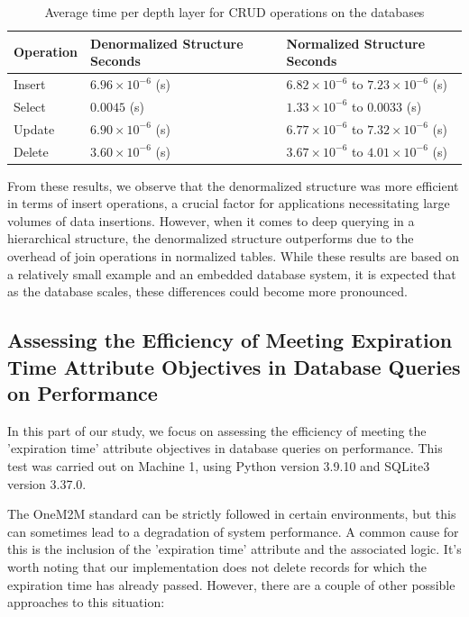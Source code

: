 \documentclass[a4paper,fleqn]{cas-dc}
\begin{document}
\begin{table}[h]
\scriptsize
\centering
\caption{Average time per depth layer for CRUD operations on the databases}
\label{tab:DBComparisonResults}
\begin{tabular}{ p{1cm} p{3cm} p{3cm} }
\hline
\textbf{Operation} & \textbf{Denormalized Structure Seconds} & \textbf{Normalized Structure Seconds} \\
\hline \hline
Insert & $6.96 \times 10^{-6}$ (s) & $6.82 \times 10^{-6}$ to $7.23 \times 10^{-6}$ (s) \\
Select & $0.0045$ (s) & $1.33 \times 10^{-6}$ to $0.0033$ (s) \\
Update & $6.90 \times 10^{-6}$ (s) & $6.77 \times 10^{-6}$ to $7.32 \times 10^{-6}$ (s) \\
Delete & $3.60 \times 10^{-6}$ (s) & $3.67 \times 10^{-6}$ to $4.01 \times 10^{-6}$ (s) \\
\hline
\end{tabular}
\end{table}

From these results, we observe that the denormalized structure was more efficient in terms of insert operations, a crucial factor for applications necessitating large volumes of data insertions. However, when it comes to deep querying in a hierarchical structure, the denormalized structure outperforms due to the overhead of join operations in normalized tables. While these results are based on a relatively small example and an embedded database system, it is expected that as the database scales, these differences could become more pronounced.

\subsection{Assessing the Efficiency of Meeting Expiration Time Attribute Objectives in Database Queries on Performance}

In this part of our study, we focus on assessing the efficiency of meeting the 'expiration time' attribute objectives in database queries on performance. This test was carried out on Machine 1, using Python version 3.9.10 and SQLite3 version 3.37.0.

The OneM2M standard can be strictly followed in certain environments, but this can sometimes lead to a degradation of system performance. A common cause for this is the inclusion of the 'expiration time' attribute and the associated logic. It's worth noting that our implementation does not delete records for which the expiration time has already passed. However, there are a couple of other possible approaches to this situation:
\end{document}
